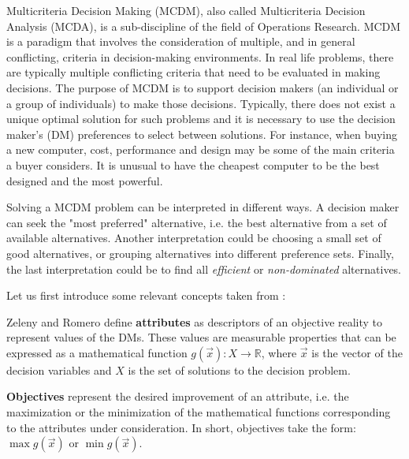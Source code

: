 Multicriteria Decision Making (MCDM), also called Multicriteria Decision Analysis (MCDA), is a sub-discipline of the field of Operations Research. MCDM is a paradigm that involves the consideration of multiple, and in general conflicting, criteria in decision-making environments. In real life problems, there are typically multiple conflicting criteria that need to be evaluated in making decisions. The purpose of MCDM is to support decision makers (an individual or a group of individuals) to make those decisions. Typically, there does not exist a unique optimal solution for such problems and it is necessary to use the decision maker's (DM) preferences to select between solutions. For instance, when buying a new computer, cost, performance and design may be some of the main criteria a buyer considers. It is unusual to have the cheapest computer to be the best designed and the most powerful. 


Solving a MCDM problem can be interpreted in different ways. A decision maker can seek the "most preferred" alternative, i.e. the best alternative from a set of available alternatives. Another interpretation could be choosing a small set of good alternatives, or grouping alternatives into different preference sets. Finally, the last interpretation could be to find all \textit{efficient} or \textit{non-dominated} alternatives. 

Let us first introduce some relevant concepts taken from \citep{Romero1991,Romero1993}: 

\begin{defi}\label{defi:attribute}
Zeleny \citep{Zeleny1982} and Romero define \textbf{attributes} as descriptors of an objective reality to represent values of the DMs. These values are measurable properties that can be expressed as a mathematical function $g(\vec x): X \rightarrow \mathbb{R}$, where $\vec x$ is the vector of the decision variables and $X$ is the set of solutions to the decision problem. 
\end{defi}

\begin{defi}\label{defi:objective}
\textbf{Objectives} represent the desired improvement of an attribute, i.e. the maximization or the minimization of the mathematical functions corresponding to the attributes under consideration. In short, objectives take the form: $\max g(\vec x)$ or $\min g(\vec x)$.
\end{defi} 

